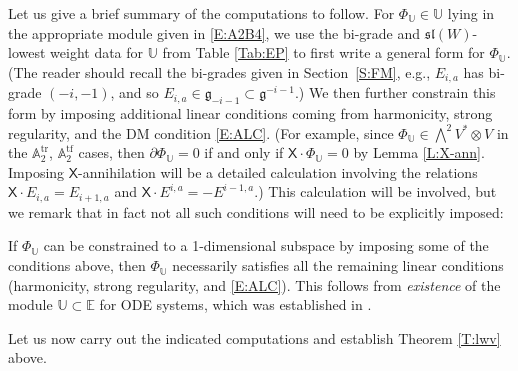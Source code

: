 \documentclass[10pt,a4paper]{amsart}
\DeclareMathOperator{\tf}{tf}
\DeclareMathOperator{\tr}{tr}
\newcommand\fg{\mathfrak{g}}
\newcommand\fsl{\mathfrak{sl}}
\newcommand\bbE{\mathbb{E}}
\newcommand\bbU{\mathbb{U}}
\newcommand\bbA{\mathbb{A}}
\newcommand\sfX{\mathsf{X}}
\numberwithin{equation}{section}
\begin{document}
Let us give a brief summary of the computations to follow. For $\Phi_\bbU \in \bbU$ lying in the appropriate module given in \eqref{E:A2B4}, we use the bi-grade and $\fsl(W)$-lowest weight data for $\bbU$ from Table \ref{Tab:EP} to first write a general form for $\Phi_\bbU$. (The reader should recall the bi-grades given in Section~\ref{S:FM}, e.g., $E_{i,a}$ has bi-grade $(-i,-1)$, and so $E_{i,a} \in \fg_{-i-1} \subset \fg^{-i-1}$.) We then further constrain this form by imposing additional linear conditions coming from harmonicity, strong regularity, and the DM condition \eqref{E:ALC}. (For example, since $\Phi_\bbU \in \bigwedge^2 V^* \otimes V$ in the $\bbA_2^{\tr}$, $\bbA_2^{\tf}$ cases, then $\partial \Phi_\bbU = 0$ if and only if $\sfX \cdot \Phi_\bbU = 0$ by Lemma \ref{L:X-ann}. Imposing $\sfX$-annihilation will be a detailed calculation involving the relations $\sfX \cdot E_{i,a} = E_{i+1,a}$ and $\sfX \cdot E^{i,a} = -E^{i-1,a}$.) This calculation will be involved, but we remark that in fact not all such conditions will need to be explicitly imposed:

\begin{Remark}\label{R:NS}
If $\Phi_\bbU$ can be constrained to a 1-dimensional subspace by imposing some of the conditions above, then $\Phi_\bbU$ necessarily satisfies all the remaining linear conditions (harmonicity, strong regularity, and \eqref{E:ALC}). This follows from {\em existence} of the module $\bbU \subset \bbE$ for ODE systems, which was established in \cite{DM2014, Medvedev2010}.
\end{Remark}

Let us now carry out the indicated computations and establish Theorem \ref{T:lwv} above.
\end{document}
